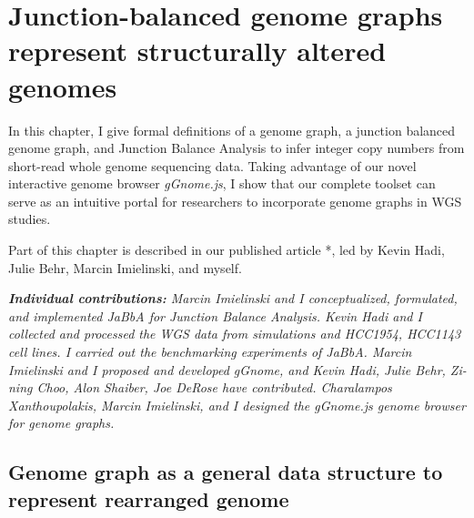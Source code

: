 \documentclass[phd,tocprelim]{cornell}
\begin{document}
\chapter{Junction-balanced genome graphs represent structurally altered genomes} \label{chap:gg}
In this chapter, I give formal definitions of a genome graph, a junction balanced genome graph, and Junction Balance Analysis to infer integer copy numbers from short-read whole genome sequencing data. Taking advantage of our novel interactive genome browser \textit{gGnome.js}, I show that our complete toolset can serve as an intuitive portal for researchers to incorporate genome graphs in WGS studies. 

Part of this chapter is described in our published article \cite{Hadi2020-um}*, led by Kevin Hadi, Julie Behr, Marcin Imielinski, and myself.

\textit{
    \textbf{Individual contributions:} Marcin Imielinski and I conceptualized, formulated, and implemented JaBbA for Junction Balance Analysis. Kevin Hadi and I collected and processed the WGS data from simulations and HCC1954, HCC1143 cell lines. I carried out the benchmarking experiments of JaBbA. Marcin Imielinski and I proposed and developed gGnome, and Kevin Hadi, Julie Behr, Zi-ning Choo, Alon Shaiber, Joe DeRose have contributed. Charalampos Xanthoupolakis, Marcin Imielinski, and I designed the gGnome.js genome browser for genome graphs.    
}


\newpage

\section{Genome graph as a general data structure to represent rearranged genome}
\end{document}
